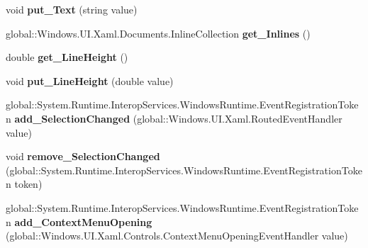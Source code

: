 \begin{DoxyCompactItemize}
\item 
\mbox{\label{class_windows_1_1_u_i_1_1_xaml_1_1_controls_1_1_text_block_aa509823085f394729f1646a2acf564c4}} 
void {\bfseries put\+\_\+\+Text} (string value)
\item 
\mbox{\label{class_windows_1_1_u_i_1_1_xaml_1_1_controls_1_1_text_block_a6b2eb2ee12b7795ff5bfb850402083d6}} 
global\+::\+Windows.\+U\+I.\+Xaml.\+Documents.\+Inline\+Collection {\bfseries get\+\_\+\+Inlines} ()
\item 
\mbox{\label{class_windows_1_1_u_i_1_1_xaml_1_1_controls_1_1_text_block_a07976cf606fca5824f633f63d8da6936}} 
double {\bfseries get\+\_\+\+Line\+Height} ()
\item 
\mbox{\label{class_windows_1_1_u_i_1_1_xaml_1_1_controls_1_1_text_block_adbefe17b425b126a3b1d3598cf3b68f4}} 
void {\bfseries put\+\_\+\+Line\+Height} (double value)
\item 
\mbox{\label{class_windows_1_1_u_i_1_1_xaml_1_1_controls_1_1_text_block_af80d81341031136a13a2687720d46da0}} 
global\+::\+System.\+Runtime.\+Interop\+Services.\+Windows\+Runtime.\+Event\+Registration\+Token {\bfseries add\+\_\+\+Selection\+Changed} (global\+::\+Windows.\+U\+I.\+Xaml.\+Routed\+Event\+Handler value)
\item 
\mbox{\label{class_windows_1_1_u_i_1_1_xaml_1_1_controls_1_1_text_block_a0ec7a0aed82f465da9f07b1f0bb2f222}} 
void {\bfseries remove\+\_\+\+Selection\+Changed} (global\+::\+System.\+Runtime.\+Interop\+Services.\+Windows\+Runtime.\+Event\+Registration\+Token token)
\item 
\mbox{\label{class_windows_1_1_u_i_1_1_xaml_1_1_controls_1_1_text_block_abe06af10f87317e305ba6d841b08607c}} 
global\+::\+System.\+Runtime.\+Interop\+Services.\+Windows\+Runtime.\+Event\+Registration\+Token {\bfseries add\+\_\+\+Context\+Menu\+Opening} (global\+::\+Windows.\+U\+I.\+Xaml.\+Controls.\+Context\+Menu\+Opening\+Event\+Handler value)

\end{DoxyCompactItemize}
